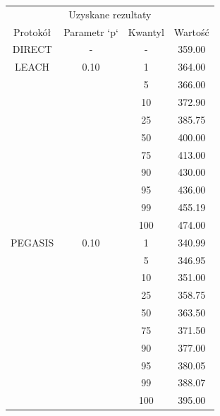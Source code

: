 \documentclass[a4paper,12pt,twoside,openany]{report}
\begin{document}
\begin{longtable}{*{4}{c}}
\toprule
\multicolumn{4}{c}{Uzyskane rezultaty} \\
Protokół	& Parametr `p`	& Kwantyl	& Wartość \\
\midrule
\endhead
DIRECT	& - 	& -	& 359.00 \\*
\midrule
LEACH	& 0.10	& 1	& 364.00 \\*
	&	& 5	& 366.00 \\*
	&	& 10	& 372.90 \\*
	&	& 25	& 385.75 \\*
	&	& 50	& 400.00 \\*
	&	& 75	& 413.00 \\*
	&	& 90	& 430.00 \\*
	&	& 95	& 436.00 \\*
	&	& 99	& 455.19 \\*
	&	& 100	& 474.00 \\*
\midrule
PEGASIS	& 0.10	& 1	& 340.99 \\*
	&	& 5	& 346.95 \\*
	&	& 10	& 351.00 \\*
	&	& 25	& 358.75 \\*
	&	& 50	& 363.50 \\*
	&	& 75	& 371.50 \\*
	&	& 90	& 377.00 \\*
	&	& 95	& 380.05 \\*
	&	& 99	& 388.07 \\*
	&	& 100	& 395.00 \\*
\bottomrule
\end{longtable}
\end{document}
